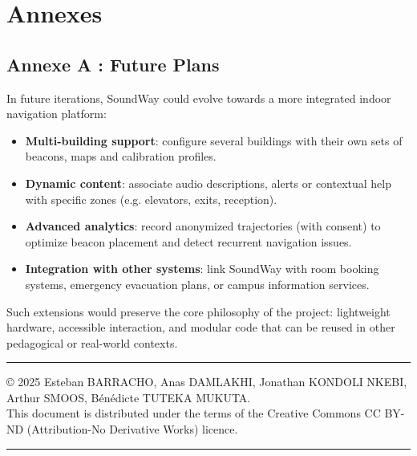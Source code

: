 \documentclass[12pt,a4paper]{article}
\begin{document}
\section{Annexes}

\subsection{Annexe A : Future Plans}

In future iterations, SoundWay could evolve towards a more integrated indoor navigation platform:

\begin{itemize}
    \item \textbf{Multi-building support}: configure several buildings with their own sets of beacons, maps and calibration profiles.
    \item \textbf{Dynamic content}: associate audio descriptions, alerts or contextual help with specific zones (e.g. elevators, exits, reception).
    \item \textbf{Advanced analytics}: record anonymized trajectories (with consent) to optimize beacon placement and detect recurrent navigation issues.
    \item \textbf{Integration with other systems}: link SoundWay with room booking systems, emergency evacuation plans, or campus information services.
\end{itemize}

Such extensions would preserve the core philosophy of the project: lightweight hardware, accessible interaction, and modular code that can be reused in other pedagogical or real-world contexts.

\bigskip

\hrule

\bigskip

{\small \noindent © 2025 Esteban BARRACHO, Anas DAMLAKHI, Jonathan KONDOLI NKEBI,\\
Arthur SMOOS, Bénédicte TUTEKA MUKUTA.\\
This document is distributed under the terms of the Creative Commons CC BY-ND (Attribution-No Derivative Works) licence. \doclicenseThis}

\bigskip

\hrule
\end{document}
